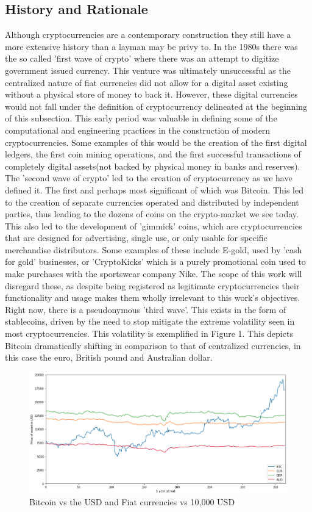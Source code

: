\documentclass[bsc,frontabs,singlespacing,parskip,deptreport]{infthesis}
\begin{document}
    \subsection{History and Rationale}
    \noindent Although cryptocurrencies are a contemporary construction they still have a more extensive history than a layman may be privy to. In the 1980s there was the so called 'first wave of crypto' where there was an attempt to digitize government issued currency. This venture was ultimately unsuccessful as the centralized nature of fiat currencies did not allow for a digital asset existing without a physical store of money to back it. However, these digital currencies would not fall under the definition of cryptocurrency delineated at the beginning of this subsection. This early period was valuable in defining some of the computational and engineering practices in the construction of modern cryptocurrencies. Some examples of this would be the creation of the first digital ledgers, the first coin mining operations, and the first successful transactions of completely digital assets(not backed by physical money in banks and reserves). 
    \smallbreak
    \noindent
    The 'second wave of crypto' led to the creation of cryptocurrency as we have defined it. The first and perhaps most significant of which was  Bitcoin. This led to the creation of separate currencies operated and distributed by independent parties, thus leading to the dozens of coins on the crypto-market we see today. This also led to the development of 'gimmick' coins, which are cryptocurrencies that are designed for advertising, single use, or only usable for specific merchandise distributors. Some examples of these include E-gold, used by 'cash for gold' businesses, or 'CryptoKicks' which is a purely promotional coin used to make purchases with the sportswear company Nike. The scope of this work will disregard these, as despite being registered as legitimate cryptocurrencies their functionality and usage makes them wholly irrelevant to this work's objectives.
    \smallbreak
    \noindent
    Right now, there is a pseudonymous 'third wave'. This exists in the form of stablecoins, driven by the need to stop mitigate the extreme volatility seen in most cryptocurrencies. This volatility is exemplified in Figure 1. This depicts Bitcoin dramatically shifting in comparison to that of centralized currencies, in this case the euro, British pound and Australian dollar. 
    \begin{figure}[h]
    \centering
      \includegraphics[width=\linewidth]{Images and Figures/bitcoinvsfiat.png}
      \caption{Bitcoin vs the USD and Fiat currencies vs 10,000 USD}
    \end{figure}
\end{document}
